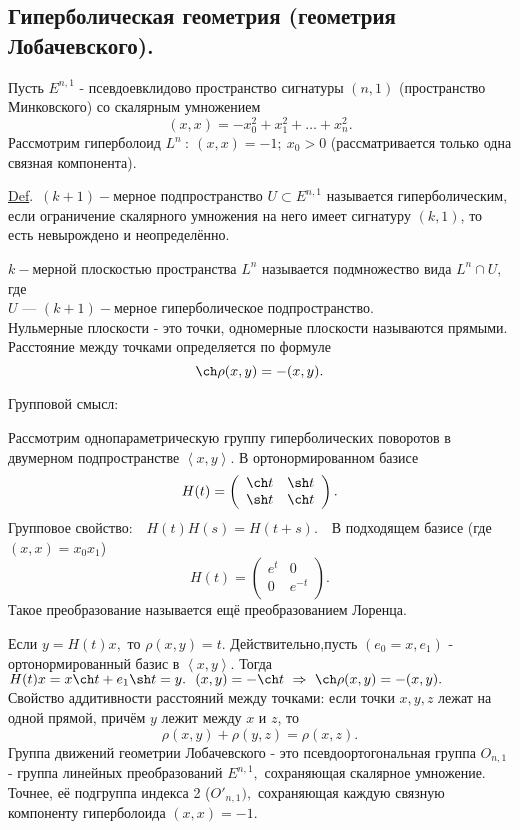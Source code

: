 \documentclass[draft]{article}%
\newcommand{\de}{\par\noindent\underline{Def}.\ }%
\newcommand{\ab}{\par\noindent}%
\newcommand{\lob}[1]{\left\langle#1\right\rangle}%
\begin{document}
\subsection{Гиперболическая геометрия (геометрия Лобачевского).}
Пусть $E^{n,1}$ - псевдоевклидово пространство сигнатуры $(n,1)$ (пространство Минковского) со скалярным умножением
$$(x,x)=-x_0^2+x_1^2+\dots+x_n^2.$$
Рассмотрим гиперболоид $L^n\ :\ (x,x)=-1;\ x_0>0$ (рассматривается только одна связная компонента).
\de $(k+1)-$мерное подпространство $U\subset E^{n,1}$ называется гиперболическим, если ограничение скалярного умножения на
него имеет сигнатуру $(k,1)$, то есть невырождено и неопределённо.
\ab$k-$мерной плоскостью пространства $L^n$ называется подмножество вида $L^n\cap U,$ где \\
$U$ --- $(k+1)-$мерное гиперболическое подпространство.\\
Нульмерные плоскости - это точки, одномерные плоскости называются прямыми.
\\ Расстояние между точками определяется по формуле $$\ch\rho(x,y)=-(x,y).$$
\ab Групповой смысл:
\ab Рассмотрим однопараметрическую группу гиперболических поворотов в двумерном подпространстве $\lob{x,y}.$
В ортонормированном базисе
$$
H(t)=\left(%
\begin{array}{cc}
  \ch t & \sh t \\
  \sh t & \ch t \\
\end{array}%
\right).
$$
Групповое свойство:\ \ $H(t)H(s)=H(t+s).$\ \ В подходящем базисе (где $(x,x)=x_0x_1$)
$$
H(t)=\left(%
\begin{array}{cc}
  e^t & 0 \\
  0 & e^{-t} \\
\end{array}%
\right).
$$
Такое преобразование называется ещё преобразованием Лоренца.
\ab Если $y=H(t)x,$ то $\rho(x,y)=t.$ Действительно,пусть $(e_0=x,e_1)$ - ортонормированный базис в $\lob{x,y}$.
Тогда $H(t)x=x\ch t+e_1\sh t=y.\ \ (x,y)=-\ch t\ \Rightarrow\ \ch\rho(x,y)=-(x,y).$
\\Свойство аддитивности расстояний между точками: если точки $x,y,z$ лежат на одной прямой, причём $y$ лежит между
$x$ и $z$, то $$\rho(x,y)+\rho(y,z)=\rho(x,z).$$
Группа движений геометрии Лобачевского - это псевдоортогональная группа $O_{n,1}$ - группа линейных
преобразований $E^{n,1},$ сохраняющая скалярное умножение. Точнее, её подгруппа индекса 2 ($O'_{n,1}),$ сохраняющая
каждую связную компоненту гиперболоида $(x,x)=-1.$
\end{document}
